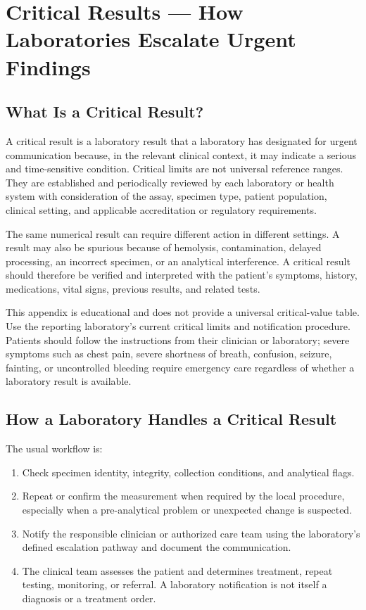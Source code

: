 \chapter{Critical Results --- How Laboratories Escalate Urgent Findings}
\label{app:critical_values}

\clearpage
\section{What Is a Critical Result?}

A critical result is a laboratory result that a laboratory has designated for urgent communication because, in the relevant clinical context, it may indicate a serious and time-sensitive condition. Critical limits are not universal reference ranges. They are established and periodically reviewed by each laboratory or health system with consideration of the assay, specimen type, patient population, clinical setting, and applicable accreditation or regulatory requirements.

The same numerical result can require different action in different settings. A result may also be spurious because of hemolysis, contamination, delayed processing, an incorrect specimen, or an analytical interference. A critical result should therefore be verified and interpreted with the patient's symptoms, history, medications, vital signs, previous results, and related tests.

\begin{notebox}[Important]
This appendix is educational and does not provide a universal critical-value table. Use the reporting laboratory's current critical limits and notification procedure. Patients should follow the instructions from their clinician or laboratory; severe symptoms such as chest pain, severe shortness of breath, confusion, seizure, fainting, or uncontrolled bleeding require emergency care regardless of whether a laboratory result is available.
\end{notebox}

\section{How a Laboratory Handles a Critical Result}

The usual workflow is:
\begin{enumerate}
    \item Check specimen identity, integrity, collection conditions, and analytical flags.
    \item Repeat or confirm the measurement when required by the local procedure, especially when a pre-analytical problem or unexpected change is suspected.
    \item Notify the responsible clinician or authorized care team using the laboratory's defined escalation pathway and document the communication.
    \item The clinical team assesses the patient and determines treatment, repeat testing, monitoring, or referral. A laboratory notification is not itself a diagnosis or a treatment order.
\end{enumerate}

